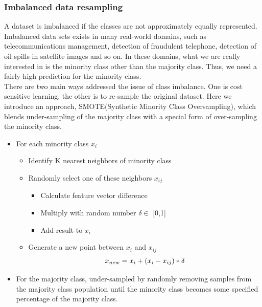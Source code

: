 	\subsubsection{Imbalanced data resampling}
	\noindent A dataset is imbalanced if the classes are not approximately equally represented. Imbalanced
	data sets exists in many real-world domains, such as telecommunications management, detection of fraudulent telephone, detection of oil spills in satellite images and so on. In these domains, what we are really interested in is the minority class other than the majority class. Thus, we need a fairly high prediction for the minority class. \\
	[\baselineskip]\indent There are two main ways addressed the issue of class imbalance.	One is cost sensitive learning, the other is to re-sample the original dataset. Here we introduce an approach, SMOTE(Synthetic Minority Class Oversampling), which blends under-sampling of the majority class with a special form of over-sampling the minority class.\citep{smote}
	 \begin{itemize}
		\item For each minority class \boldmath$ x_{i} $
			\begin{itemize}
		 	\item Identify K nearest neighbors of minority class
		 	\item Randomly select one of these neighbors \boldmath$ x_{ij} $
		 	\begin{itemize}
		 	\item Calculate feature vector difference
		 	\item Multiply with random number $\delta \in$ [0,1]
		 	\item Add result to \boldmath$ x_{i} $
		 	\end{itemize}
			\item Generate a new point between $ x_{i} $ and $x_{ij} $\\
     \begin{equation}\label{}
x_{new} =  x_{i} + (x_{i}-x_{ij})*\delta \\
    \end{equation}
		\end{itemize}
		\item For the majority class, under-sampled by randomly removing samples from the majority class
		population until the minority class becomes some specified percentage of the majority class.
	\end{itemize}
	 
